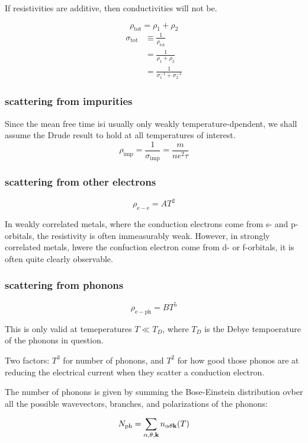 \documentclass[10pt, a4paper, twocolumn]{article}
\begin{document}
If resistivities are additive, then conductivities will not be.

\[\rho _\mathrm{tot}=\rho _1+\rho _2\]
\begin{equation*}
\begin{aligned}
\sigma _\mathrm{tot} &\equiv\frac{1}{\rho _\mathrm{tot}}
\\&=\frac{1}{\rho _1 +\rho _2}
\\&=\frac{1}{\sigma _1^{-1}+\sigma _2^{-1}}
\end{aligned}
\end{equation*}

\subsubsection{scattering from impurities}

Since the mean free time isi usually only weakly temperature-dpendent, we shall assume the Drude result to hold at all temperatures of interest.
\[\rho _\mathrm{imp}=\frac{1}{\sigma _\mathrm{imp}}
=\frac{m}{ne^2\tau}\]

\subsubsection{scattering from other electrons}
\[\rho _\mathrm{e-e}=AT^2\]

In weakly correlated metals, where the conduction electrons come from s- and p-orbitals, the resistivity is often immeasurably weak. However, in strongly correlated metals, hwere the confuction electron come from d- or f-orbitals, it is often quite clearly observable.

\subsubsection{scattering from phonons}

\[\rho _\mathrm{e-ph}=BT^5\]

This is only valid at temeperatures $T\ll T_D$, where $T_D$ is the Debye tempoerature of the phonons in question.

Two factors: $T^3$ for number of phonons, and $T^2$ for how good those phonos are at reducing the electrical current when they scatter a conduction electron.

The number of phonons is given by summing the Bose-Einstein distribution ovber all the possible wavevectors, branches, and polarizations of the phonons:

\[N_\mathrm{ph} = \sum _{\alpha,\theta,\vb k}
n_{\alpha\theta\vb k}(T)\]
\end{document}
